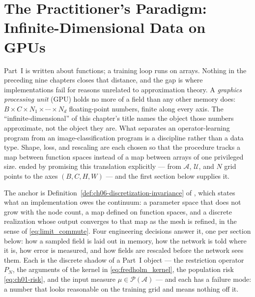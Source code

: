 
\chapter{The Practitioner's Paradigm: Infinite-Dimensional Data on GPUs}
\label{ch:part2-the-practitioner-s-paradigm-infinite-dimen}
\label{sec:practitioner}

Part~I is written about functions; a training loop runs on arrays. Nothing in the
preceding nine chapters closes that distance, and the gap is where implementations fail
for reasons unrelated to approximation theory.
A \emph{graphics processing unit} (GPU)
holds no more of a field than any other memory does: $B \times C \times N_1 \times
\cdots \times N_d$ floating-point numbers, finite along every axis. The
``infinite-dimensional'' of this chapter's title names the object those numbers
approximate, not the object they are. What separates an operator-learning program from
an image-classification program is a discipline rather than a data type. Shape, loss,
and rescaling are each chosen so that the procedure tracks a map between function spaces
instead of a map between arrays of one privileged size.
 ended by promising this
translation explicitly --- from $\mathcal{A}$, $\mathcal{U}$, and $N$ grid points to the
axes $(B, C, H, W)$ --- and the first section below supplies it.

The anchor is Definition~\ref{def:ch06-discretization-invariance} of
, which states what an
implementation owes the continuum: a parameter space that does not grow with the node
count, a map defined on function spaces, and a discrete realization whose output
converges to that map as the mesh is refined, in the sense of \eqref{eq:limit_commute}.
Four engineering decisions answer it, one per section below: how a sampled field is laid
out in memory, how the network is told where it
is, how error is measured, and how fields are rescaled before the network sees them.
Each is the discrete shadow of a Part~I object --- the restriction operator $P_N$, the
arguments of the kernel in \eqref{eq:fredholm_kernel}, the population risk
\eqref{eq:ch01-risk}, and the input measure $\mu \in \mathcal{P}(\mathcal{A})$ --- and each
has a failure mode: a number that looks reasonable on the training grid and means nothing
off it.

